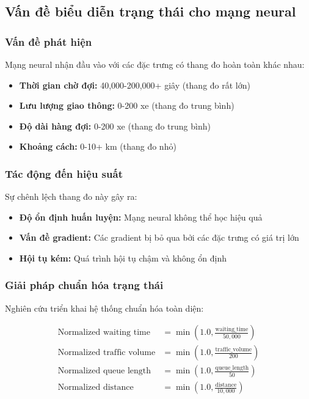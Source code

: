 \subsection{Vấn đề biểu diễn trạng thái cho mạng neural}

\subsubsection{Vấn đề phát hiện}
Mạng neural nhận đầu vào với các đặc trưng có thang đo hoàn toàn khác nhau:
\begin{itemize}
    \item \textbf{Thời gian chờ đợi:} 40,000-200,000+ giây (thang đo rất lớn)

    \item \textbf{Lưu lượng giao thông:} 0-200 xe (thang đo trung bình)

    \item \textbf{Độ dài hàng đợi:} 0-200 xe (thang đo trung bình)

    \item \textbf{Khoảng cách:} 0-10+ km (thang đo nhỏ)
\end{itemize}

\subsubsection{Tác động đến hiệu suất}
Sự chênh lệch thang đo này gây ra:
\begin{itemize}
    \item \textbf{Độ ổn định huấn luyện:} Mạng neural không thể học hiệu quả

    \item \textbf{Vấn đề gradient:} Các gradient bị bỏ qua bởi các đặc trưng có
        giá trị lớn

    \item \textbf{Hội tụ kém:} Quá trình hội tụ chậm và không ổn định
\end{itemize}

\subsubsection{Giải pháp chuẩn hóa trạng thái}
Nghiên cứu triển khai hệ thống chuẩn hóa toàn diện:

\begin{align}
    \text{Normalized waiting time}   & = \min\left(1.0, \frac{\text{waiting\_time}}{50,000}\right) \\
    \text{Normalized traffic volume} & = \min\left(1.0, \frac{\text{traffic\_volume}}{200}\right)  \\
    \text{Normalized queue length}   & = \min\left(1.0, \frac{\text{queue\_length}}{50}\right)     \\
    \text{Normalized distance}       & = \min\left(1.0, \frac{\text{distance}}{10,000}\right)
\end{align}


